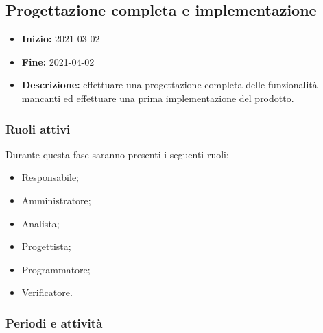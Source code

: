 

\subsection{Progettazione completa e implementazione} \label{_pianificazioneProgettazioneCompletaImplementazione}
\begin{itemize}
    \item []\textbf{Inizio:} 2021-03-02
    \item []\textbf{Fine:} 2021-04-02
    \item []\textbf{Descrizione:} effettuare una progettazione completa delle funzionalità mancanti ed effettuare una prima implementazione del prodotto.
\end{itemize}

\subsubsection{Ruoli attivi}
Durante questa fase saranno presenti i seguenti ruoli:
\begin{itemize}
    \item Responsabile;
    \item Amministratore;
    \item Analista;
    \item Progettista;
    \item Programmatore;
    \item Verificatore.
\end{itemize}

\subsubsection{Periodi e attività}

